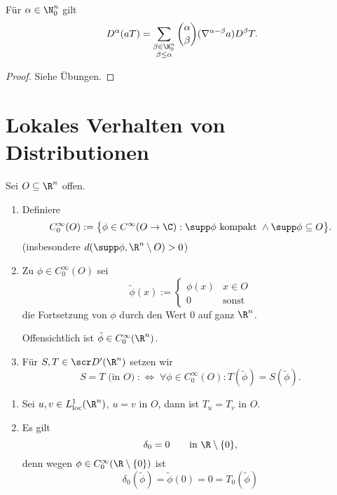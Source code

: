 \begin{st} \label{5.19}
	Für $\alpha \in \N_0^n$ gilt
	\[
		D^\alpha (a T) = \sum_{\substack{\beta \in \N_0^n \\ \beta \le \alpha}} \binom{\alpha}{\beta} (\nabla^{\alpha-\beta} a) D^\beta T.
	\]
	\begin{proof}
		Siehe Übungen.
	\end{proof}
\end{st}


\section{Lokales Verhalten von Distributionen}

\begin{df} \label{5.20}
	Sei $O \subset \R^n$ offen.
	\begin{enumerate}[1)]
		\item
			Definiere
			\[
				C_0^\infty(O) := \big\{ \phi \in C^\infty(O \to \C) : \supp \phi \text{ kompakt } \land \supp \phi \subset O \big\}.
			\]
			(insbesondere $d(\supp \phi, \R^n \setminus O) > 0$)
		\item
			Zu $\phi \in C_0^\infty (O)$ sei 
			\[
				\tilde \phi(x) := \begin{cases}
					\phi(x) & x \in O \\
					0 & \text{sonst}
				\end{cases}
			\]
			die Fortsetzung von $\phi$ durch den Wert $0$ auf ganz $\R^n$.

			Offensichtlich ist $\tilde \phi \in C_0^\infty (\R^n)$.
		\item
			Für $S,T \in \scr D'(\R^n)$ setzen wir
			\[
				S = T \text{ (in $O$)} \; :\iff \;
				\forall \phi \in  C_0^\infty (O) : T(\tilde \phi) = S(\tilde \phi).
			\]
	\end{enumerate}
\end{df}

\begin{ex} \label{5.21}
	\begin{enumerate}[1)]
		\item
			Sei $u,v \in L_{\text{loc}}^1(\R^n)$, $u =v $ in $O$, dann ist $T_u = T_v$ in $O$.
		\item
			Es gilt
			\[
				\delta_0 = 0
				\qquad \text{in $\R \setminus \{0\}$},
			\]
			denn wegen $\phi \in C_0^\infty (\R \setminus \{0\})$ ist 
			\[
				\delta_0(\tilde \phi) = \tilde \phi(0) = 0 = T_0(\tilde \phi)
			\]
	\end{enumerate}
\end{ex}

